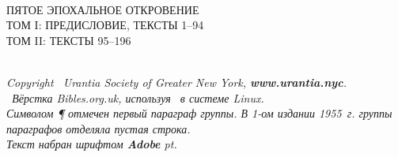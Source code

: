 \begin{center}
\bibcovertitlefont\urantiabook\\[3ex]
\huge ПЯТОЕ ЭПОХАЛЬНОЕ ОТКРОВЕНИЕ\\
\ifmultivol
\Large
\ifvoli ТОМ I: ПРЕДИСЛОВИЕ, ТЕКСТЫ 1--94\\\fi
\ifvolii ТОМ II: ТЕКСТЫ 95--196\\\fi
\fi
{}
\titlesepbig\\
\end{center}

\titleframe

\newpage

\begin{center}
\begin{center}\end{center}
\itshape
{}
Copyright \textcopyright\ Urantia Society of Greater New York, {\upshape\bfseries www.urantia.nyc}.\\
\tux\ Вёрстка Bibles.org.uk, используя \XeLaTeX\ в системе Linux.\\
Символом {\upshape \P} отмечен первый параграф группы. В 1-ом издании 1955~г. группы параграфов отделяла пустая строка.\\
Текст набран шрифтом \textbf{Adobe \urantiamainfont} \urantiamainfontsize pt.\\[4pt]
\upshape\normalsize\bfseries\mytoday{}\\
\end{center}

\titleframe
